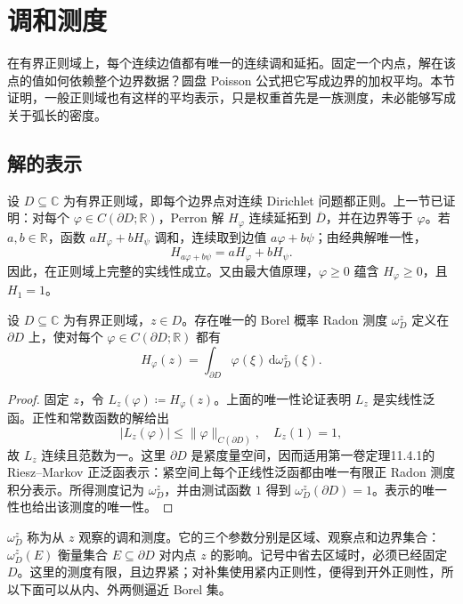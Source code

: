 \section{调和测度}
\label{b3:sec:1604}

在有界正则域上，每个连续边值都有唯一的连续调和延拓。固定一个内点，解在该点的值如何依赖整个边界数据？圆盘 Poisson 公式把它写成边界的加权平均。本节证明，一般正则域也有这样的平均表示，只是权重首先是一族测度，未必能够写成关于弧长的密度。

\subsection{解的表示}
\label{b3:subsec:160401}

设 \(D\subseteq\mathbb C\) 为有界正则域，即每个边界点对连续 Dirichlet 问题都正则。上一节已证明：对每个 \(\varphi\in C(\partial D;\mathbb R)\)，Perron 解 \(H_\varphi\) 连续延拓到 \(\overline D\)，并在边界等于 \(\varphi\)。若 \(a,b\in\mathbb R\)，函数 \(aH_\varphi+bH_\psi\) 调和，连续取到边值 \(a\varphi+b\psi\)；由经典解唯一性，
\[
 H_{a\varphi+b\psi}=aH_\varphi+bH_\psi.
\]
因此，在正则域上完整的实线性成立。又由最大值原理，\(\varphi\ge0\) 蕴含 \(H_\varphi\ge0\)，且 \(H_1=1\)。

\begin{theorem}[调和测度表示]\label{b3:thm:16-harmonic-measure}
设 \(D\subseteq\mathbb C\) 为有界正则域，\(z\in D\)。存在唯一的 Borel 概率 Radon 测度 \(\omega_D^z\) 定义在 \(\partial D\) 上，使对每个 \(\varphi\in C(\partial D;\mathbb R)\) 都有
\begin{equation}\label{b3:eq:16-harmonic-measure-representation}
 H_\varphi(z)=\int_{\partial D}\varphi(\xi)\,\mathrm d\omega_D^z(\xi).
\end{equation}
\end{theorem}
\begin{proof}
固定 \(z\)，令 \(L_z(\varphi)\coloneqq H_\varphi(z)\)。上面的唯一性论证表明 \(L_z\) 是实线性泛函。正性和常数函数的解给出
\[
 |L_z(\varphi)|\le\|\varphi\|_{C(\partial D)},
 \quad L_z(1)=1,
\]
故 \(L_z\) 连续且范数为一。这里 \(\partial D\) 是紧度量空间，因而适用第一卷定理11.4.1的 Riesz--Markov 正泛函表示：紧空间上每个正线性泛函都由唯一有限正 Radon 测度积分表示。所得测度记为 \(\omega_D^z\)，并由测试函数 \(1\) 得到 \(\omega_D^z(\partial D)=1\)。表示的唯一性也给出该测度的唯一性。
\end{proof}

\(\omega_D^z\) 称为从 \(z\) 观察的调和测度。它的三个参数分别是区域、观察点和边界集合：\(\omega_D^z(E)\) 衡量集合 \(E\subseteq\partial D\) 对内点 \(z\) 的影响。记号中省去区域时，必须已经固定 \(D\)。这里的测度有限，且边界紧；对补集使用紧内正则性，便得到开外正则性，所以下面可以从内、外两侧逼近 Borel 集。

